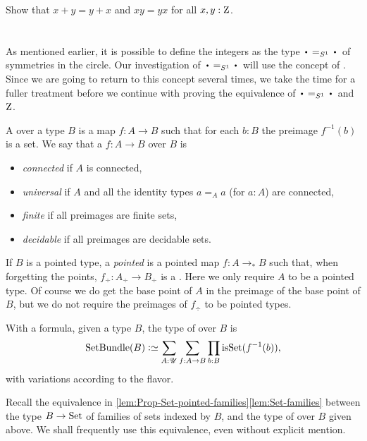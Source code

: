 \begin{xca}\label{xca:commutative-add-Z}
  Show that $x+y = y+x$ and $xy=yx$ for all $x,y:\mathrm{Z}$.
\end{xca}

\section{\Coverings}
\label{sec:covering}

As mentioned earlier, it is possible to define the integers as the
type $\base=_{S^1}\base$ of symmetries in the circle.
Our investigation of $\base=_{S^1}\base$ will use the concept of \coverings. 
Since we are going to return to this concept several times, 
we take the time for a fuller treatment before we continue with
proving the equivalence of $\base=_{S^1}\base$ and $\mathrm{Z}$.

\begin{definition}\label{def:covering}
A \emph{\covering} over a type $B$ 
is a map $f:A\to B$ such that for each $b:B$ the preimage $f^{-1}(b)$ is a set.
We say that a \covering $f:A\to B$ over $B$ is
\begin{itemize}
\item \emph{connected} if $A$ is connected, 
\item \emph{universal} if $A$ and all
the identity types $a=_Aa$ (for $a:A$) are connected, 
\item \emph{finite} if all preimages are finite sets,
\item \emph{decidable} if all preimages are decidable sets.
\end{itemize}
If $B$ is a pointed type, a \emph{pointed} \covering is a pointed map $f:A\to_*B$ such that, when forgetting the points, $f_\div:A_\div\to B_\div$ is a \covering. Here we only
require $A$ to be a pointed type. Of course we do get the base point of $A$ in the 
preimage of the base point of $B$, but we do not require the preimages of $f_\div$
to be pointed types.
\end{definition}
With a formula, given a type $B$, the type of \coverings over $B$ is
\[
\SetBundle(B) \defeq \sum_{A:\UU}\sum_{f:A\to B}\prod_{b:B}\isset(f^{-1}(b)),
\]
with variations according to the flavor.

Recall the equivalence in \cref{lem:Prop-Set-pointed-families}\ref{lem:Set-families}
between the type $B\to\mathrm{Set}$ of families of sets indexed by $B$, and the type
of \coverings over $B$ given above.
We shall frequently use this equivalence, even without explicit mention.

